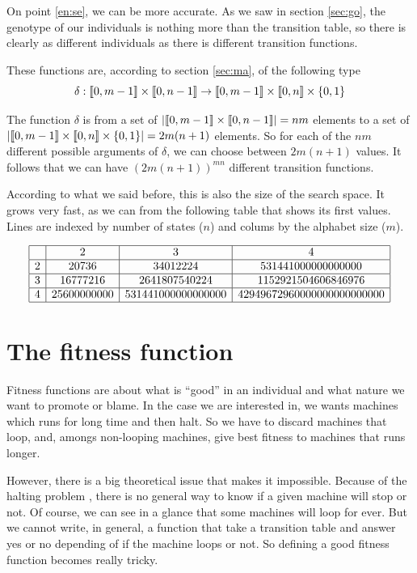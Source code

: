 \documentclass{report}
\begin{document}
On point \ref{en:se}, we can be more accurate. As we saw in section \ref{sec:go}, the genotype of our individuals is nothing more than the transition table, so there is clearly as different individuals as there is different transition functions.

These functions are, according to section \ref{sec:ma}, of the following type
\[
  \delta : \llbracket 0, m-1 \rrbracket \times \llbracket 0, n-1 \rrbracket \to \llbracket 0, m-1 \rrbracket \times \llbracket 0, n \rrbracket \times \{0,1\}
\]

The function $\delta$ is from a set of $|\llbracket 0, m-1 \rrbracket \times \llbracket 0, n-1 \rrbracket| = nm$ elements to a set of $|\llbracket 0, m-1 \rrbracket \times \llbracket 0, n \rrbracket \times \{0,1\}| = 2m(n+1)$ elements. So for each of the $nm$ different possible arguments of $\delta$, we can choose between $2m(n+1)$ values.
It follows that we can have $(2 m (n+1))^{mn}$ different transition functions.

According to what we said before, this is also the size of the search space. It grows very fast, as we can from the following table that shows its first values. Lines are indexed by number of states ($n$) and colums by the alphabet size ($m$).

\[
\begin{array}{|c|c|c|c|c|}
  \hline
    & 2         & 3              & 4\\
  \hline
  2 & 20736     &34012224          &531441000000000000\\
  \hline
  3 &16777216   &2641807540224     &1152921504606846976\\
  \hline
  4 &25600000000&531441000000000000&42949672960000000000000000\\
  \hline
\end{array}
\]

\section{The fitness function}
\label{sec:fitness}

Fitness functions are about what is ``good'' in an individual and what nature we want to promote or blame.
In the case we are interested in, we wants machines which runs for long time and then halt. So we have to discard machines that loop, and, amongs non-looping machines, give best fitness to machines that runs longer.

However, there is a big theoretical issue that makes it impossible. Because of the halting problem \cite{turing}, there is no general way to know if a given machine will stop or not. Of course, we can see in a glance that some machines will loop for ever. But we cannot write, in general, a function that take a transition table and answer yes or no depending of if the machine loops or not. So defining a good fitness function becomes really tricky.
\end{document}
